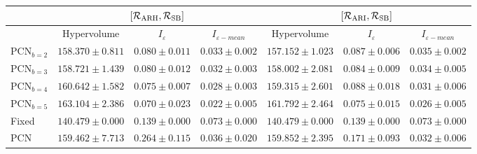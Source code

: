 \begin{tabular}{|l|c|c|c||c|c|c|}
    \hline
        & \multicolumn{3}{c||}{$[\mathcal{R}_\text{ARH}, \mathcal{R}_\text{SB}]$} & \multicolumn{3}{c|}{$[\mathcal{R}_\text{ARI}, \mathcal{R}_\text{SB}]$} \\
    \hline
        & Hypervolume & $I_\varepsilon$ & $I_{\varepsilon-mean}$ & Hypervolume & $I_\varepsilon$ & $I_{\varepsilon-mean}$ \\
    \hline
    $\text{PCN}_{b=2}$ & $158.370 \pm 0.811$ & $0.080 \pm 0.011$ & $0.033 \pm 0.002$ & $157.152 \pm 1.023$ & $0.087 \pm 0.006$ & $0.035 \pm 0.002$ \\
    \hline
    $\text{PCN}_{b=3}$ & $158.721 \pm 1.439$ & $0.080 \pm 0.012$ & $0.032 \pm 0.003$ & $158.002 \pm 2.081$ & $0.084 \pm 0.009$ & $0.034 \pm 0.005$ \\
    \hline
    $\text{PCN}_{b=4}$ & $160.642 \pm 1.582$ & $0.075 \pm 0.007$ & $0.028 \pm 0.003$ & $159.315 \pm 2.601$ & $0.088 \pm 0.018$ & $0.031 \pm 0.006$ \\
    \hline
    $\text{PCN}_{b=5}$ & $163.104 \pm 2.386$ & $0.070 \pm 0.023$ & $0.022 \pm 0.005$ & $161.792 \pm 2.464$ & $0.075 \pm 0.015$ & $0.026 \pm 0.005$ \\
    \hline
    Fixed & $140.479 \pm 0.000$ & $0.139 \pm 0.000$ & $0.073 \pm 0.000$ & $140.479 \pm 0.000$ & $0.139 \pm 0.000$ & $0.073 \pm 0.000$ \\
    \hline
    $\text{PCN}$ & $159.462 \pm 7.713$ & $0.264 \pm 0.115$ & $0.036 \pm 0.020$ & $159.852 \pm 2.395$ & $0.171 \pm 0.093$ & $0.032 \pm 0.006$ \\
    \hline
\end{tabular}